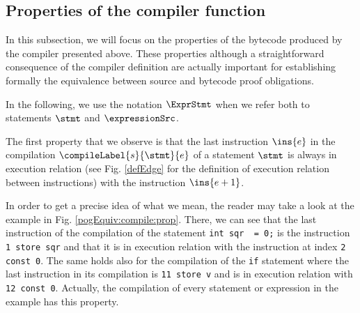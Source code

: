 
\newtheorem{compProp0}{Property}[subsection]
\newtheorem{compProp1}[compProp0]{Property} %
\newtheorem{compProp2}[compProp0]{Property} %
\newtheorem{compProp11}[compProp0]{Property}
\newtheorem{compProp6}[compProp0]{Property} %
\newtheorem{compProp3}[compProp0]{Property} %
\newtheorem{compProp7}[compProp0]{Property} %

\newtheorem{compProp8}[compProp0]{Property} %
\newtheorem{compProp9}[compProp0]{Property}
\newtheorem{compProp10}[compProp0]{Property}
\newtheorem{compProp4}[compProp0]{Property} %
\newtheorem{compProp5}[compProp0]{Property} %
\newtheorem{seqInstr}{Definition}[subsection]

\newcommand{\isStartExc}[1]{\mbox{\rm\textit{isExcHandlerStart}}(#1)}

\subsection{Properties of the compiler function}\label{compile:prop}
In this subsection, we will focus on the properties of the  bytecode produced by the compiler presented above.
These properties although a straightforward consequence of the compiler definition
 are actually important for establishing formally the equivalence between source and bytecode 
proof obligations. %


In the following, we use the notation $\ExprStmt$ when we refer both to statements $\stmt$ and $\expressionSrc$.
 
 The first property that we observe is that the last instruction $\ins{e}$ in the compilation
 $\compileLabel{s}{\stmt}{e}$  of a statement $\stmt$ is always in execution relation
 (see Fig. \ref{defEdge} for the definition of execution relation between instructions) with the
 instruction $\ins{e + 1}$.

In order to get a precise idea of what we mean, the reader may take a look at the example in Fig. \ref{pogEquiv:compile:prop}.
There, we can see that the last instruction of the compilation of the statement \lstinline!int sqr  = 0;! is the instruction \lstinline!1 store sqr! 
and that it is in execution relation with the instruction at index \lstinline!2 const 0!. The same holds also for the compilation of the \lstinline!if!
statement where the last instruction  in its compilation is \lstinline!11 store v! and is  in execution relation with \lstinline!12 const 0!.
Actually, the compilation of every statement or expression in the example has this property.

